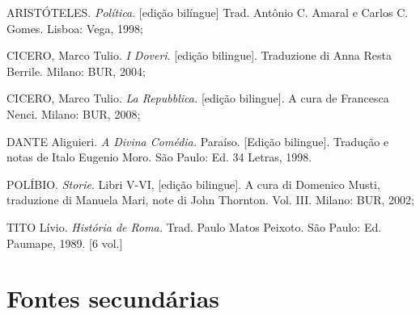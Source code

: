 \begin{Parskip}
ARISTÓTELES. \emph{Política}. {[}edição bilíngue{]} Trad. Antônio C.
Amaral e Carlos C. Gomes. Lisboa: Vega, 1998;

CICERO, Marco Tulio. \emph{I Doveri}. {[}edição bilingue{]}. Traduzione
di Anna Resta Berrile. Milano: BUR, 2004;

CICERO, Marco Tulio. \emph{La Repubblica.} {[}edição bilingue{]}. A cura
de Francesca Nenci. Milano: BUR, 2008;

DANTE Aliguieri. \emph{A Divina Comédia.} Paraíso. {[}Edição
bilingue{]}. Tradução e notas de Italo Eugenio Moro. São Paulo: Ed. 34
Letras, 1998.

POLÍBIO. \emph{Storie}. Libri V-VI, {[}edição bilingue{]}. A cura di
Domenico Musti, traduzione di Manuela Mari, note di John Thornton. Vol.
III. Milano: BUR, 2002;

TITO Lívio. \emph{História de Roma.} Trad. Paulo Matos Peixoto. São
Paulo: Ed. Paumape, 1989. {[}6 vol.{]}
\end{Parskip}

\section*{Fontes secundárias}

